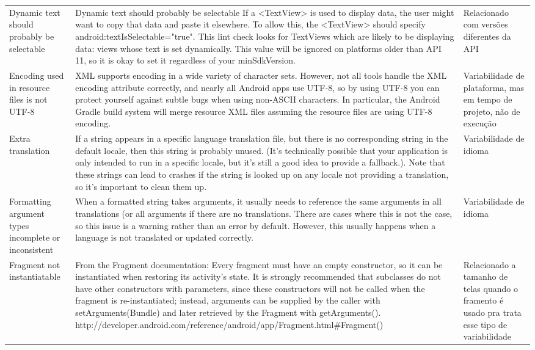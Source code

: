 \begin{landscape}
\begin{longtable}{p{30mm}|p{180mm}|p{25mm}}
Dynamic text should probably be selectable
&Dynamic text should probably be selectable If a <TextView> is used to display data, the user might want to copy that data and paste it elsewhere. To allow this, the <TextView> should specify android:textIsSelectable="true". This lint check looks for TextViews which are likely to be displaying data: views whose text is set dynamically. This value will be ignored on platforms older than API 11, so it is okay to set it regardless of your minSdkVersion.
&Relacionado com versões diferentes da API\\

Encoding used in resource files is not UTF-8
&XML supports encoding in a wide variety of character sets. However, not all tools handle the XML encoding attribute correctly, and nearly all Android apps use UTF-8, so by using UTF-8 you can protect yourself against subtle bugs when using non-ASCII characters. In particular, the Android Gradle build system will merge resource XML files assuming the resource files are using UTF-8 encoding.
&Variabilidade de plataforma, mas em tempo de projeto, não de execução\\

Extra translation
&If a string appears in a specific language translation file, but there is no corresponding string in the default locale, then this string is probably unused. (It's technically possible that your application is only intended to run in a specific locale, but it's still a good idea to provide a fallback.). Note that these strings can lead to crashes if the string is looked up on any locale not providing a translation, so it's important to clean them up.
&Variabilidade de idioma\\

Formatting argument types incomplete or inconsistent
&When a formatted string takes arguments, it usually needs to reference the same arguments in all translations (or all arguments if there are no translations. There are cases where this is not the case, so this issue is a warning rather than an error by default. However, this usually happens when a language is not translated or updated correctly.
&Variabilidade de idioma\\

Fragment not instantiatable
&From the Fragment documentation: Every fragment must have an empty constructor, so it can be instantiated when restoring its activity's state. It is strongly recommended that subclasses do not have other constructors with parameters, since these constructors will not be called when the fragment is re-instantiated; instead, arguments can be supplied by the caller with setArguments(Bundle) and later retrieved by the Fragment with getArguments(). http://developer.android.com/reference/android/app/Fragment.html\#Fragment()
&Relacionado a tamanho de telas quando o framento é usado pra trata esse tipo de variabilidade\\


\end{longtable}
\end{landscape}
